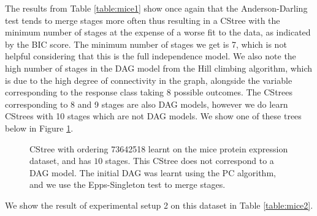 \documentclass{tufte-book}
\begin{document}
The results from Table \ref{table:mice1} show once again that the Anderson-Darling test tends to merge stages more often thus resulting in a CStree with the minimum number of stages at the expense of a worse fit to the data, as indicated by the BIC score. The minimum number of stages we get is 7, which is not helpful considering that this is the full independence model. We also note the high number of stages in the DAG model from the Hill climbing algorithm, which is due to the high degree of connectivity in the graph, alongside the variable corresponding to the response class taking 8 possible outcomes. The CStrees corresponding to 8 and 9 stages are also DAG models, however we do learn CStrees with 10 stages which are not DAG models. We show one of these trees below in Figure \ref{fig:mice10stage}.



\begin{figure}[]\label{fig:mice10stage}
   \begin{floatrow}
%
\caption{CStree with ordering 73642518 learnt on the mice protein expression dataset, and has $10$ stages. This CStree does not correspond to a DAG model. The initial DAG was learnt using the PC algorithm, and we use the Epps-Singleton test to merge stages.}
        
   \end{floatrow}
\end{figure}


We show the result of experimental setup 2 on this dataset in Table \ref{table:mice2}.

\end{document}
